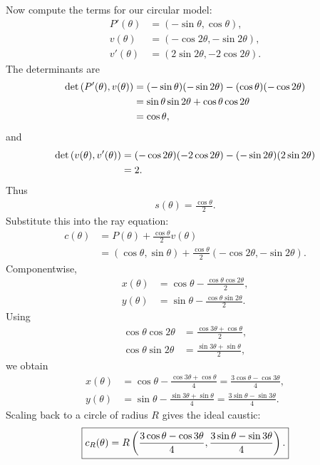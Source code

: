 \documentclass[11pt]{article}
\begin{document}
Now compute the terms for our circular model:
\begin{align}
  P'(\theta)&=(-\sin\theta,\cos\theta),\\
  v(\theta)&=(-\cos2\theta,-\sin2\theta),\\
  v'(\theta)&=(2\sin2\theta,-2\cos2\theta).
\end{align}
The determinants are
\begin{align}
  \det\left( P'(\theta),v(\theta) \right)
    &=
    (-\sin\theta)(-\sin2\theta)
    -(\cos\theta)(-\cos2\theta)\\
    &=
    \sin\theta\sin2\theta+\cos\theta\cos2\theta\\
    &=
    \cos\theta,
\end{align}
and
\begin{align}
  \det\left( v(\theta),v'(\theta) \right)
    &=
    (-\cos2\theta)(-2\cos2\theta)
    -(-\sin2\theta)(2\sin2\theta)\\
    &=2.
\end{align}
Thus
\begin{align}
  s(\theta)=\frac{\cos\theta}{2}.
\end{align}
Substitute this into the ray equation:
\begin{align}
  c(\theta)
    &=P(\theta)+\frac{\cos\theta}{2}v(\theta)\\
    &=(\cos\theta,\sin\theta)
      +\frac{\cos\theta}{2}(-\cos2\theta,-\sin2\theta).
\end{align}
Componentwise,
\begin{align}
  x(\theta)
    &=\cos\theta-\frac{\cos\theta\cos2\theta}{2},\\
  y(\theta)
    &=\sin\theta-\frac{\cos\theta\sin2\theta}{2}.
\end{align}
Using
\begin{align}
  \cos\theta\cos2\theta
    &=\frac{\cos3\theta+\cos\theta}{2},\\
  \cos\theta\sin2\theta
    &=\frac{\sin3\theta+\sin\theta}{2},
\end{align}
we obtain
\begin{align}
  x(\theta)
    &=
    \cos\theta-\frac{\cos3\theta+\cos\theta}{4}
     =
    \frac{3\cos\theta-\cos3\theta}{4},\\
  y(\theta)
    &=
    \sin\theta-\frac{\sin3\theta+\sin\theta}{4}
     =
    \frac{3\sin\theta-\sin3\theta}{4}.
\end{align}
Scaling back to a circle of radius \(R\) gives the ideal caustic:
\begin{align}
  \boxed{
  c_R(\theta)=
  R\left( 
  \frac{3\cos\theta-\cos3\theta}{4},
  \frac{3\sin\theta-\sin3\theta}{4}
   \right).
  }
  \label{eq:nephroid-caustic}
\end{align}
\end{document}
